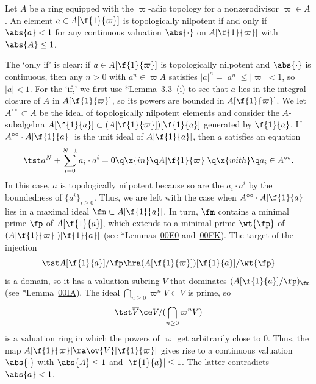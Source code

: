  \label{nilp-lem}
Let $A$ be a ring equipped with the $\varpi$-adic topology for a nonzerodivisor $\varpi \in A$. An element $a \in A[\f{1}{\varpi}]$ is topologically nilpotent  if and only if $\abs{a} < 1$ for any continuous valuation $\abs{\cdot}$ on $A[\f{1}{\varpi}]$ with $\abs{A} \le 1$.
\elem

\bpf
The `only if' is clear: if $a \in A[\f{1}{\varpi}]$ is topologically nilpotent and $\abs{\cdot}$ is continuous, then any $n > 0$ with $a^n \in \varpi A$ satisfies $|a|^n = |a^n| \le |\varpi| < 1$, so $|a| < 1$. For the `if,' we first use \cite{Hub93a}*{Lemma~3.3~(i)} to see that $a$ lies in the integral closure of $A$ in $A[\f{1}{\varpi}]$, so its powers are bounded in $A[\f{1}{\varpi}]$. We let $A^{\circ\circ} \subset A$ be the ideal of topologically nilpotent elements %
and consider the $A$-subalgebra
$A[\f{1}{a}] \subset (A[\f{1}{\varpi}])[\f{1}{a}]$ generated by $\f{1}{a}$.
If $A^{\circ\circ}\cdot A[\f{1}{a}]$ is the unit ideal of $A[\f{1}{a}]$, then $a$ satisfies an equation %
\[
\tst a^N + \sum_{i = 0}^{N - 1} a_i \cdot a^i = 0 \q \x{in} \q A[\f{1}{\varpi}] \q \x{with} \q a_i \in A^{\circ\circ}.
\]
In this case, $a$ is topologically nilpotent because so are the $a_i \cdot a^i$ by the boundedness of $\{a^i\}_{i \ge 0}$. Thus, we are left with the case when $A^{\circ\circ} \cdot A[\f{1}{a}]$ lies in a maximal ideal $\fm \subset A[\f{1}{a}]$. In turn, $\fm$ contains a minimal prime $\fp$ of $A[\f{1}{a}]$, which extends to a minimal prime $\wt{\fp}$ of $(A[\f{1}{\varpi}])[\f{1}{a}]$ (see \cite{SP}*{Lemmas~\href{https://stacks.math.columbia.edu/tag/00E0}{00E0} and~\href{https://stacks.math.columbia.edu/tag/00FK}{00FK}}). The target of the injection
\[
\tst A[\f{1}{a}]/\fp \hra (A[\f{1}{\varpi}])[\f{1}{a}]/\wt{\fp}
\]
is a domain, so it has a valuation subring $V$ that dominates $(A[\f{1}{a}]/\fp)_\fm$ (see \cite{SP}*{Lemma~\href{https://stacks.math.columbia.edu/tag/00IA}{00IA}}). The ideal $\bigcap_{n \ge 0} \varpi^n V \subset V$ is prime, so
\[
\tst\overline{V} \ce V/(\bigcap_{n \ge 0} \varpi^n V)
\]
is a valuation ring in which the powers of $\varpi$ get arbitrarily close to $0$. Thus, the map $A[\f{1}{\varpi}] \ra \ov{V}[\f{1}{\varpi}]$ gives rise to a continuous valuation $\abs{\cdot}$ with $\abs{A} \le 1$ and $|\f{1}{a} | \le 1$. The latter contradicts $\abs{a} < 1$.
\epf







